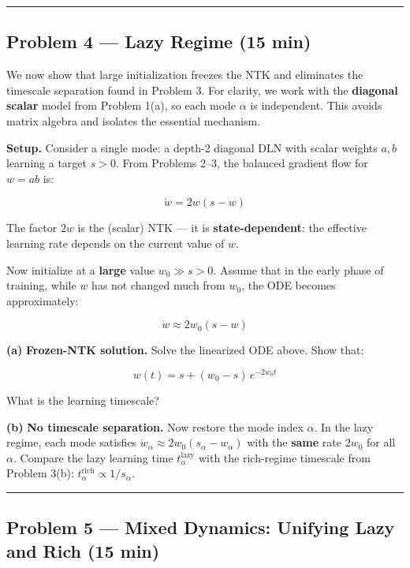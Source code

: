 \documentclass[
]{article}
\begin{document}
\begin{center}\rule{0.5\linewidth}{0.5pt}\end{center}

\subsection{Problem 4 --- Lazy Regime (15
min)}\label{problem-4-lazy-regime-15-min}

We now show that large initialization freezes the NTK and eliminates the
timescale separation found in Problem 3. For clarity, we work with the
\textbf{diagonal scalar} model from Problem 1(a), so each mode
\(\alpha\) is independent. This avoids matrix algebra and isolates the
essential mechanism.

\textbf{Setup.} Consider a single mode: a depth-2 diagonal
DLN with scalar weights \(a, b\) learning a target \(s > 0\). From
Problems 2--3, the balanced gradient flow for \(w = ab\) is:

\[\dot{w} = 2w(s - w)\]

The factor \(2w\) is the (scalar) NTK --- it is
\textbf{state-dependent}: the effective learning rate depends on the
current value of \(w\).

Now initialize at a \textbf{large} value \(w_0 \gg s > 0\). Assume that in
the early phase of training, while \(w\) has not changed much from
\(w_0\), the ODE becomes approximately:

\[\dot{w} \approx 2w_0(s - w)\]

\textbf{(a)} \textbf{Frozen-NTK solution.} Solve the linearized ODE
above. Show that:

\[w(t) = s + (w_0 - s)\,e^{-2w_0 t}\]

What is the learning timescale?

\textbf{(b)} \textbf{No timescale separation.} Now restore the mode
index \(\alpha\). In the lazy regime, each mode satisfies
\(\dot{w}_\alpha \approx 2w_0(s_\alpha - w_\alpha)\) with the
\textbf{same} rate \(2w_0\) for all \(\alpha\). Compare the lazy
learning time \(t_\alpha^{\text{lazy}}\) with the rich-regime timescale
from Problem 3(b): \(t_\alpha^{\text{rich}} \propto 1/s_\alpha\).

\begin{center}\rule{0.5\linewidth}{0.5pt}\end{center}

\subsection{Problem 5 --- Mixed Dynamics: Unifying Lazy and Rich (15
min)}\label{problem-5-mixed-dynamics-unifying-lazy-and-rich-15-min}
\end{document}
